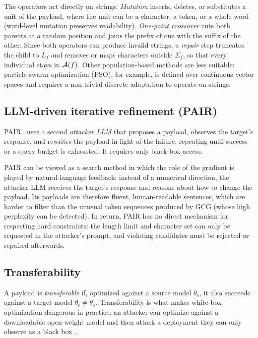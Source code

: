 The operators act directly on strings. \emph{Mutation} inserts, deletes, or substitutes a unit of the payload, where the unit can be a character, a token, or a whole word (word-level mutation preserves readability). \emph{One-point crossover} cuts both parents at a random position and joins the prefix of one with the suffix of the other. Since both operators can produce invalid strings, a \emph{repair} step truncates the child to $L_f$ and removes or maps characters outside $\Sigma_f$, so that every individual stays in $\mathcal{A}(f)$. Other population-based methods are less suitable: particle swarm optimization (PSO), for example, is defined over continuous vector spaces and requires a non-trivial discrete adaptation to operate on strings.

\subsection{LLM-driven iterative refinement (PAIR)}
\label{sec:opt-pair}

PAIR~\cite{chao2025pair} uses a second \emph{attacker LLM} that proposes a payload, observes the target's response, and rewrites the payload in light of the failure, repeating until success or a query budget is exhausted. It requires only black-box access.

PAIR can be viewed as a search method in which the role of the gradient is played by natural-language feedback: instead of a numerical direction, the attacker LLM receives the target's response and reasons about how to change the payload. Its payloads are therefore fluent, human-readable sentences, which are harder to filter than the unusual token sequences produced by GCG (whose high perplexity can be detected). In return, PAIR has no direct mechanism for respecting hard constraints: the length limit and character set can only be requested in the attacker's prompt, and violating candidates must be rejected or repaired afterwards.

\subsection{Transferability}
\label{sec:opt-transfer}

A payload is \emph{transferable} if, optimized against a source model $\theta_s$, it also succeeds against a target model $\theta_t \ne \theta_s$. Transferability is what makes white-box optimization dangerous in practice: an attacker can optimize against a downloadable open-weight model and then attack a deployment they can only observe as a black box~\cite{zou2023gcg}.
